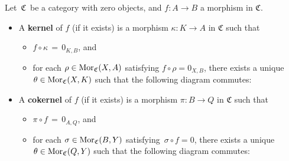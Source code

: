 \vskip 0.5cm
\begin{definition}
\mbox{}
\vskip 0.15cm
\noindent
Let \,$\mathfrak{C}$\, be a category with zero objects, and $f : A \longrightarrow B$ a morphism in $\mathfrak{C}$.
\begin{itemize}
\item
	A \textbf{kernel} of $f$ (if it exists) is a morphism $\kappa : K \longrightarrow A$ in $\mathfrak{C}$ such that
	\begin{itemize}
	\item
		\vskip -0.15cm
		$f \circ \kappa \,=\, 0_{K,B}$, and
	\item
		for each $\rho \in \textnormal{Mor}_{\mathfrak{C}}(X,A)$ satisfying $f \circ \rho = 0_{X,B}$,
		there exists a unique $\theta \in \textnormal{Mor}_{\mathfrak{C}}(X,K)$ such that the following diagram commutes:
		\begin{center}
		\end{center}
	\end{itemize}
\item
	A \textbf{cokernel} of $f$ (if it exists) is a morphism $\pi : B \longrightarrow Q$ in $\mathfrak{C}$ such that
	\begin{itemize}
	\item
		\vskip -0.15cm
		$\pi \circ f \,=\, 0_{A,Q}$, and
	\item
		for each $\sigma \in \textnormal{Mor}_{\mathfrak{C}}(B,Y)$ satisfying \,$\sigma \circ f = 0$,
		there exists a unique $\theta \in \textnormal{Mor}_{\mathfrak{C}}(Q,Y)$ such that the following diagram commutes:
		\begin{center}
		\end{center}
	\end{itemize}
\end{itemize}
\end{definition}

